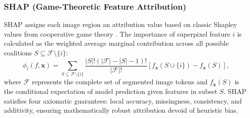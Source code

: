 \documentclass[journal]{IEEEtran}
\begin{document}
\subsubsection{SHAP (Game-Theoretic Feature Attribution)}
SHAP assigns each image region an attribution value based on classic Shapley values from cooperative game theory \cite{lundberg2017unified}. The importance of superpixel feature $i$ is calculated as the weighted average marginal contribution across all possible coalitions $S \subseteq \mathcal{F} \setminus \{i\}$:
\begin{equation}
\phi_i(f, \mathbf{x}) = \sum_{S \subseteq \mathcal{F} \setminus \{i\}} \frac{|S|!(|\mathcal{F}| - |S| - 1)!}{|\mathcal{F}|!} \left[ f_{\mathbf{x}}(S \cup \{i\}) - f_{\mathbf{x}}(S) \right],
\label{eq:shap_values}
\end{equation}
where $\mathcal{F}$ represents the complete set of segmented image tokens and $f_{\mathbf{x}}(S)$ is the conditional expectation of model prediction given features in subset $S$. SHAP satisfies four axiomatic guarantees: local accuracy, missingness, consistency, and additivity, ensuring mathematically robust attribution devoid of heuristic bias.
\end{document}
